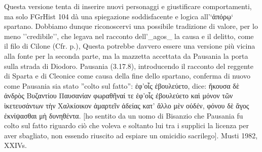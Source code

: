             Questa versione tenta di inserire nuovi personaggi e giustificare comportamenti, ma solo FGrHist 104 dà una spiegazione soddisfacente e logica all'`ἀπόρῳ` spartano. Dobbiamo dunque riconoscervi una possibile tradizione di valore, per lo meno ''credibile'', che legava nel racconto dell'_agos_ la causa e il delitto, come il filo di Cilone  (Cfr. p.), Questa potrebbe davvero essere una versione più vicina alla fonte per la seconda parte, ma la mazzetta accettata da Pausania  la porta sulla strada di Diodoro. Pausania (3.17.8), introducendo il racconto del reggente di Sparta e di Cleonice come causa della fine dello spartano, conferma di nuovo come Pausania  sia stato ''colto sul fatto'': \textgreek{ἐφ’οἷς ἐβουλεύετο, dice: ἤκουσα δὲ ἀνδρὸς Βυζαντίου Παυσανίαν φωραθῆναί τε ἐφ’οἷς ἐβουλεύετο καὶ μόνον τῶν ἱκετευσάντων τὴν Χαλκίοικον ἁμαρτεῖν ἀδείας κατ’ ἄλλο μὲν οὐδέν, φόνου δὲ ἄγος ἐκνίψασθαι μὴ δυνηθέντα.} [ho sentito da un uomo di Bisanzio che Pausania  fu colto sul fatto riguardo ciò che voleva e soltanto lui tra i supplici la licenza per aver sbagliato, non essendo riuscito ad espiare un omicidio sacrilego]. Musti 1982, XXIVs.
